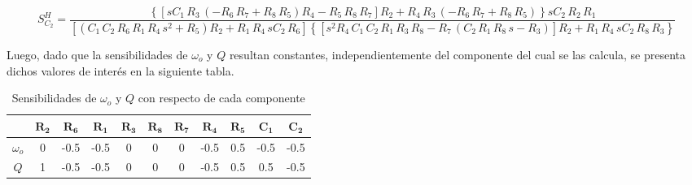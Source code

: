 \begin{equation}
S_{C_2}^{H} = {\frac { \left\lbrace  \left[ s{C_1}\,{R_3}\, \left( -{R_6}\,{R_7}+{R_8}\,{R_5} \right) {R_4}-{R_5}\,{R_8}\,{R_7}
 \right] {R_2}+{R_4}\,{R_3}\, \left( -{R_6}\,{R_7}+{
R_8}\,{R_5} \right)  \right\rbrace s{C_2}\,{R_2}\,{R_1}}{
 \left[  \left( {C_1}\,{C_2}\,{R_6}\,{R_1}\,{R_4}\,{s}^
{2}+{R_5} \right) {R_2}+{R_1}\,{R_4}\,s{C_2}\,{R_6}
 \right]  \left\lbrace  \left[ {s}^{2}{R_4}\,{C_1}\,{C_2}\,{R_1}
\,{R_3}\,{R_8}-{R_7}\, \left( {C_2}\,{R_1}\,{R_8}\,s
-{R_3} \right)  \right] {R_2}+{R_1}\,{R_4}\,s{C_2}\,{
R_8}\,{R_3} \right\rbrace }}
\end{equation}

Luego, dado que la sensibilidades de $\omega_o$ y $Q$ resultan constantes, independientemente del componente del cual se las calcula, se presenta dichos valores de interés en la siguiente tabla.
\begin{table}[H]
\centering
\begin{tabular}{ccccccccccc}
\hline
 & $\mathbf{R_2}$ & $\mathbf{R_6}$ & $\mathbf{R_1}$ & $\mathbf{R_3}$ & $\mathbf{R_8}$ & $\mathbf{R_7}$ & $\mathbf{R_4}$ & $\mathbf{R_5}$ & $\mathbf{C_1}$ & $\mathbf{C_2}$ \\
\hline
$\omega_o$ & 0 & -0.5 & -0.5 & 0 & 0 & 0 & -0.5 & 0.5 & -0.5 & -0.5 \\
$Q$ & 1 & -0.5 & -0.5 & 0 & 0 & 0 & -0.5 & 0.5 & 0.5 & -0.5	\\
\hline
\end{tabular}
\caption{Sensibilidades de $\omega_o$ y $Q$ con respecto de cada componente}
\end{table}

\newpage
